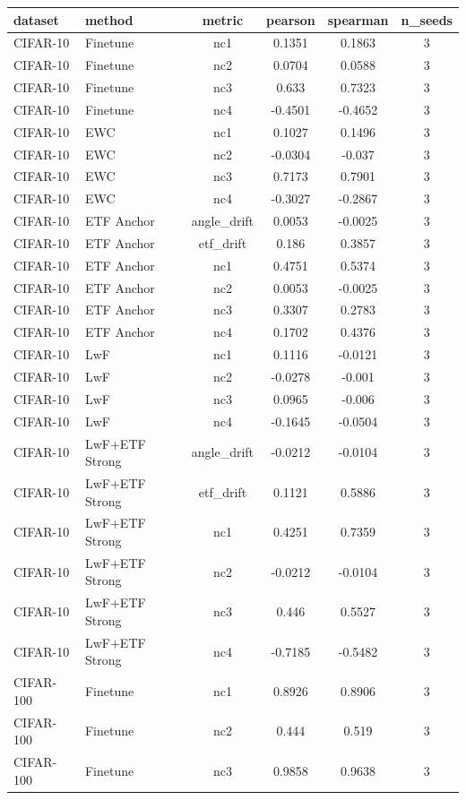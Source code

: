 \begin{tabular}{llcccc}
\hline
dataset & method & metric & pearson & spearman & n\_seeds \\
\hline
CIFAR-10 & Finetune & nc1 & 0.1351 & 0.1863 & 3 \\
CIFAR-10 & Finetune & nc2 & 0.0704 & 0.0588 & 3 \\
CIFAR-10 & Finetune & nc3 & 0.633 & 0.7323 & 3 \\
CIFAR-10 & Finetune & nc4 & -0.4501 & -0.4652 & 3 \\
CIFAR-10 & EWC & nc1 & 0.1027 & 0.1496 & 3 \\
CIFAR-10 & EWC & nc2 & -0.0304 & -0.037 & 3 \\
CIFAR-10 & EWC & nc3 & 0.7173 & 0.7901 & 3 \\
CIFAR-10 & EWC & nc4 & -0.3027 & -0.2867 & 3 \\
CIFAR-10 & ETF Anchor & angle\_drift & 0.0053 & -0.0025 & 3 \\
CIFAR-10 & ETF Anchor & etf\_drift & 0.186 & 0.3857 & 3 \\
CIFAR-10 & ETF Anchor & nc1 & 0.4751 & 0.5374 & 3 \\
CIFAR-10 & ETF Anchor & nc2 & 0.0053 & -0.0025 & 3 \\
CIFAR-10 & ETF Anchor & nc3 & 0.3307 & 0.2783 & 3 \\
CIFAR-10 & ETF Anchor & nc4 & 0.1702 & 0.4376 & 3 \\
CIFAR-10 & LwF & nc1 & 0.1116 & -0.0121 & 3 \\
CIFAR-10 & LwF & nc2 & -0.0278 & -0.001 & 3 \\
CIFAR-10 & LwF & nc3 & 0.0965 & -0.006 & 3 \\
CIFAR-10 & LwF & nc4 & -0.1645 & -0.0504 & 3 \\
CIFAR-10 & LwF+ETF Strong & angle\_drift & -0.0212 & -0.0104 & 3 \\
CIFAR-10 & LwF+ETF Strong & etf\_drift & 0.1121 & 0.5886 & 3 \\
CIFAR-10 & LwF+ETF Strong & nc1 & 0.4251 & 0.7359 & 3 \\
CIFAR-10 & LwF+ETF Strong & nc2 & -0.0212 & -0.0104 & 3 \\
CIFAR-10 & LwF+ETF Strong & nc3 & 0.446 & 0.5527 & 3 \\
CIFAR-10 & LwF+ETF Strong & nc4 & -0.7185 & -0.5482 & 3 \\
CIFAR-100 & Finetune & nc1 & 0.8926 & 0.8906 & 3 \\
CIFAR-100 & Finetune & nc2 & 0.444 & 0.519 & 3 \\
CIFAR-100 & Finetune & nc3 & 0.9858 & 0.9638 & 3 \\

\end{tabular}
